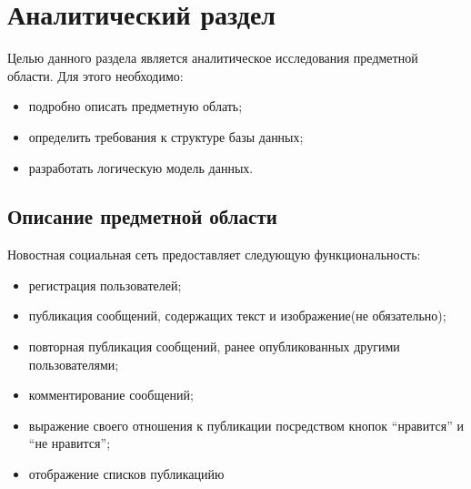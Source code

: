 \chapter{Аналитический раздел}
\label{cha:analysis}
%
%

Целью данного раздела является аналитическое исследования предметной области.
Для этого необходимо:
\begin{itemize}
\item подробно описать предметную облать;
\item определить требования к структуре базы данных;
\item разработать логическую модель данных.
\end{itemize}

\section{Описание предметной области}


Новостная социальная сеть предоставляет следующую функциональность:
\begin{itemize}
\item регистрация пользователей;
\item публикация сообщений, содержащих текст и изображение(не обязательно);
\item повторная публикация сообщений, ранее опубликованных другими пользователями;
\item комментирование сообщений;
\item выражение своего отношения к публикации посредством кнопок ``нравится'' и ``не нравится'';
\item отображение списков публикацийю
\end{itemize}

